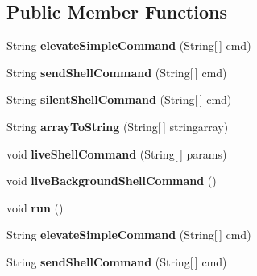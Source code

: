 \subsection*{Public Member Functions}
\begin{DoxyCompactItemize}
\item 
\hypertarget{classCASUAL_1_1Shell_a228ae0a36fd9bf8773b20d9ce67d186a}{String {\bfseries elevate\-Simple\-Command} (String\mbox{[}$\,$\mbox{]} cmd)}\label{classCASUAL_1_1Shell_a228ae0a36fd9bf8773b20d9ce67d186a}

\item 
\hypertarget{classCASUAL_1_1Shell_a7b3433f703f854ebccf0d0fb03ace169}{String {\bfseries send\-Shell\-Command} (String\mbox{[}$\,$\mbox{]} cmd)}\label{classCASUAL_1_1Shell_a7b3433f703f854ebccf0d0fb03ace169}

\item 
\hypertarget{classCASUAL_1_1Shell_a7b5fe192fb2f8643e0abf9be080108c6}{String {\bfseries silent\-Shell\-Command} (String\mbox{[}$\,$\mbox{]} cmd)}\label{classCASUAL_1_1Shell_a7b5fe192fb2f8643e0abf9be080108c6}

\item 
\hypertarget{classCASUAL_1_1Shell_a70d25c128178ed80debee0b6053dac4d}{String {\bfseries array\-To\-String} (String\mbox{[}$\,$\mbox{]} stringarray)}\label{classCASUAL_1_1Shell_a70d25c128178ed80debee0b6053dac4d}

\item 
\hypertarget{classCASUAL_1_1Shell_a37881bb2c0d03b14748bf0f0047053a1}{void {\bfseries live\-Shell\-Command} (String\mbox{[}$\,$\mbox{]} params)}\label{classCASUAL_1_1Shell_a37881bb2c0d03b14748bf0f0047053a1}

\item 
\hypertarget{classCASUAL_1_1Shell_ad5bcb0ff18bd7023fa763901f4410e24}{void {\bfseries live\-Background\-Shell\-Command} ()}\label{classCASUAL_1_1Shell_ad5bcb0ff18bd7023fa763901f4410e24}

\item 
\hypertarget{classCASUAL_1_1Shell_aa42ddb7317b31e55804c22fb973bbb3e}{void {\bfseries run} ()}\label{classCASUAL_1_1Shell_aa42ddb7317b31e55804c22fb973bbb3e}

\item 
\hypertarget{classCASUAL_1_1Shell_a228ae0a36fd9bf8773b20d9ce67d186a}{String {\bfseries elevate\-Simple\-Command} (String\mbox{[}$\,$\mbox{]} cmd)}\label{classCASUAL_1_1Shell_a228ae0a36fd9bf8773b20d9ce67d186a}

\item 
\hypertarget{classCASUAL_1_1Shell_a7b3433f703f854ebccf0d0fb03ace169}{String {\bfseries send\-Shell\-Command} (String\mbox{[}$\,$\mbox{]} cmd)}\label{classCASUAL_1_1Shell_a7b3433f703f854ebccf0d0fb03ace169}


\end{DoxyCompactItemize}

